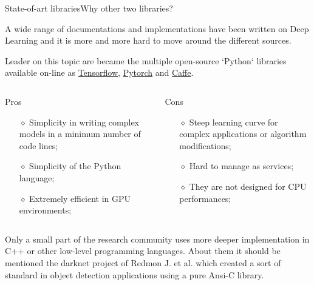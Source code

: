 \documentclass[10pt, technote, oribibl, unicode]{beamer}
\begin{document}
\begin{frame}{State-of-art libraries}{Why other two libraries?}

  \scriptsize{A wide range of documentations and implementations have been written on Deep Learning and it is more and more hard to move around the different sources.}

  \scriptsize{Leader on this topic are became the multiple open-source `Python` libraries available on-line as \href{http://tensorflow.org}{Tensorflow}, \href{http://pytorch.org}{Pytorch} and \href{http://doi.acm.org/10.1145/2647868.2654889}{Caffe}.}

  \begin{columns}

    \begin{column}{0.5\textwidth}

      \begin{block}{Pros}
        \begin{itemize}
          \item[$\diamond$] Simplicity in writing complex models in a minimum number of code lines;
          \item[$\diamond$] Simplicity of the \textsf{Python} language;
          \item[$\diamond$] Extremely efficient in GPU environments;
        \end{itemize}
      \end{block}
    \end{column}
    \begin{column}{0.5\textwidth}

      \begin{alertblock}{Cons}
        \begin{itemize}
          \item[$\diamond$] Steep learning curve for complex applications or algorithm modifications;
          \item[$\diamond$] Hard to manage as services;
          \item[$\diamond$] They are not designed for CPU performances;
        \end{itemize}
      \end{alertblock}
    \end{column}

  \end{columns}

  \vspace{0.5cm}

  \scriptsize{Only a small part of the research community uses more deeper implementation in \textsf{C++} or other low-level programming languages.}
  \scriptsize{About them it should be mentioned the \textsf{darknet project} of Redmon J. et al. which created a sort of standard in object detection applications using a pure \textsf{Ansi-C} library.}

\end{frame}
\end{document}
